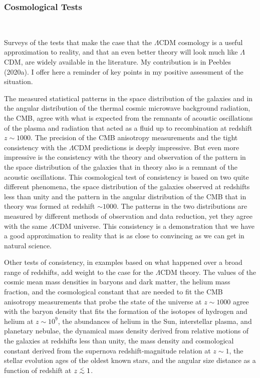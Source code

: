 \documentclass[fleqn,12pt]{article}
\def\lap{\lower.5ex\hbox{$\; \buildrel < \over \sim \;$}}
\begin{document}
\subsubsection{Cosmological Tests}~\label{sec:tests}

Surveys of the tests that make the case that the $\Lambda$CDM cosmology is a useful approximation to reality, and that an even better theory will look much like $\Lambda$CDM, are widely available in the literature. My contribution is in Peebles (2020a). I offer here a reminder of key points in my positive assessment of the situation. 

The measured statistical patterns in the space distribution of the galaxies and in the angular distribution of the thermal cosmic microwave background radiation, the CMB, agree with what is expected from the remnants of acoustic oscillations of the plasma and radiation that acted as a fluid up to recombination at redshift $z\sim 1000$.  The precision of the CMB anisotropy measurements and the tight consistency with the $\Lambda$CDM predictions is deeply impressive. But even more impressive is the consistency with the theory and observation of the pattern in the space distribution of the galaxies that in theory also is a remnant of the acoustic oscillations. This cosmological test of consistency is based on two quite different phenomena, the space distribution of the galaxies observed at redshifts less than unity and the pattern in the angular distribution of the CMB that in theory was formed at redshift $\sim 1000$. The patterns in the two distributions are measured by different methods of observation and data reduction, yet they agree with the same $\Lambda$CDM universe. This consistency is a demonstration that we have a good approximation to reality that is as close to convincing as we can get in natural science.

Other tests of consistency, in examples based on what happened over a broad range of redshifts, add weight to the case for the $\Lambda$CDM theory. The values of the cosmic mean mass densities in baryons and dark matter, the helium mass fraction, and the cosmological constant that are needed to fit the CMB anisotropy measurements that probe the state of the universe at $z\sim 1000$ agree with the baryon density that fits the formation of the isotopes of hydrogen and helium at $z\sim 10^9$, the abundances of helium in the Sun, interstellar plasma, and planetary nebulae,  the dynamical mass density derived from relative motions of the galaxies at redshifts less than unity, the mass density and cosmological constant derived from the supernova redshift-magnitude relation at $z\sim 1$, the stellar evolution ages of the oldest known stars, and the angular size distance as a function of redshift at $z\lap 1$. 
\end{document}
